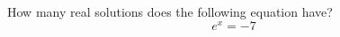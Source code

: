 \documentclass{ximera}
\author{David Kish}
\begin{document}
\begin{exercise}
How many real solutions does the following equation have? \\
\[
e^{x}=-7
\]
\begin{multipleChoice}  
\end{multipleChoice}  
\end{exercise}
\end{document}
